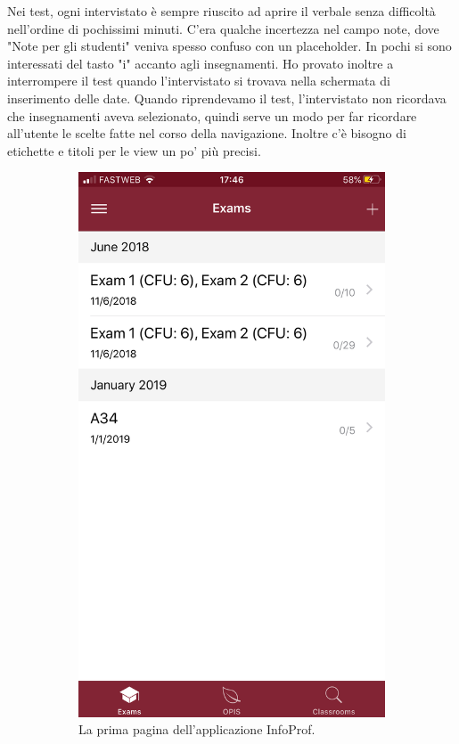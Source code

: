 \documentclass[Lau, oneside, noexaminfo]{sapthesis}%
\begin{document}
Nei test, ogni intervistato è sempre riuscito ad aprire il verbale senza difficoltà nell'ordine di pochissimi minuti. C'era qualche incertezza nel campo note, dove "Note per gli studenti" veniva spesso confuso con un placeholder. In pochi si sono interessati del tasto "i" accanto agli insegnamenti. Ho provato inoltre a interrompere il test quando l'intervistato si trovava nella schermata di inserimento delle date. Quando riprendevamo il test, l'intervistato non ricordava che insegnamenti aveva selezionato, quindi serve un modo per far ricordare all'utente le scelte fatte nel corso della navigazione. Inoltre c'è bisogno di etichette e titoli per le view un po' più precisi.

\begin{figure}[H]
	\begin{subfigure}{0.6\textwidth}
	  \centering
	  \includegraphics[width=0.5\linewidth]{ui-iterations/i/main}  
	  \caption{La prima pagina dell'applicazione InfoProf.}
	  \label{fig:sub-first}
	\end{subfigure}
	\begin{subfigure}{0.6\textwidth}
	  \centering

\end{subfigure}
\end{figure}
\end{document}
